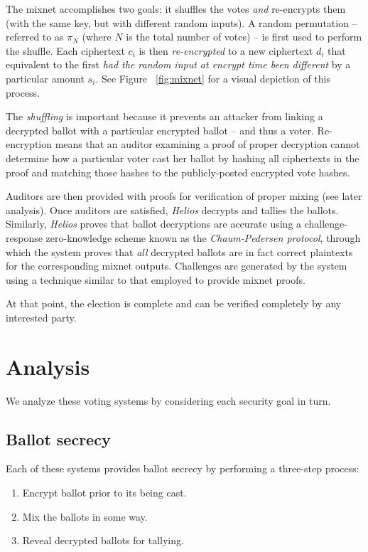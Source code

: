 \documentclass[10pt,twocolumn]{article}
\newcommand{\term}[1]{\textit{#1}}
\begin{document}
The mixnet accomplishes two goals: it shuffles the votes \emph{and} re-encrypts them (with the
same key, but with different random inputs). A random permutation -- referred to as $\pi_{N}$ (where
$N$ is the total number of votes) -- is first used to perform the shuffle. Each ciphertext
$c_{i}$ is then \term{re-encrypted} to a new ciphertext $d_{i}$ that equivalent to the first \emph{had
the random input at encrypt time been different} by a particular amount $s_{i}$. See Figure
~\ref{fig:mixnet} for a visual depiction of this process.

The \term{shuffling} is important because it prevents an attacker from linking a decrypted ballot with
a particular encrypted ballot -- and thus a voter. Re-encryption means that an auditor examining a
proof of proper decryption cannot determine how a particular voter cast her ballot by hashing
all ciphertexts in the proof and matching those hashes to the publicly-posted encrypted vote hashes.

Auditors are then provided with proofs for verification of proper mixing (see later analysis). Once
auditors are satisfied, \term{Helios} decrypts and tallies the ballots. Similarly, \term{Helios}
proves that ballot decryptions are accurate using a challenge-response zero-knowledge scheme
known as the \term{Chaum-Pedersen protocol}, through which the system proves that \emph{all}
decrypted ballots are in fact correct plaintexts for the corresponding mixnet outputs. Challenges
are generated by the system using a technique similar to that employed to provide mixnet proofs.

At that point, the election is complete and can be verified completely by any interested party.

\section{Analysis}

We analyze these voting systems by considering each security goal in turn.

\subsection{Ballot secrecy}

Each of these systems provides ballot secrecy by performing a three-step process:
\begin{enumerate}
	\item
		Encrypt ballot prior to its being cast.
	\item
		Mix the ballots in some way.
	\item
		Reveal decrypted ballots for tallying.
\end{enumerate}
\end{document}
